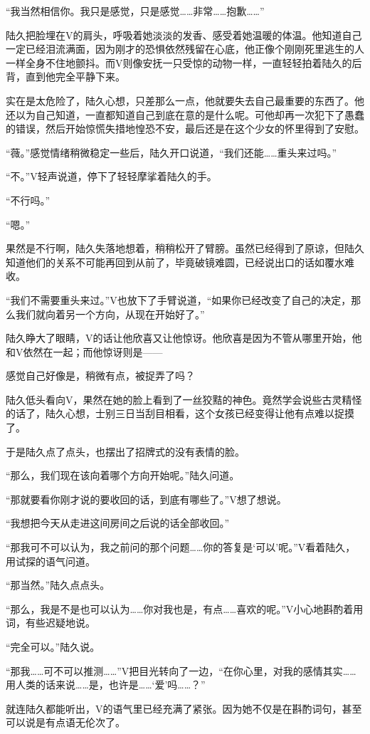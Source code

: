 “我当然相信你。我只是感觉，只是感觉……非常……抱歉……”

陆久把脸埋在V的肩头，呼吸着她淡淡的发香、感受着她温暖的体温。他知道自己一定已经泪流满面，因为刚才的恐惧依然残留在心底，他正像个刚刚死里逃生的人一样全身不住地颤抖。而V则像安抚一只受惊的动物一样，一直轻轻拍着陆久的后背，直到他完全平静下来。

实在是太危险了，陆久心想，只差那么一点，他就要失去自己最重要的东西了。他还以为自己知道，一直都知道自己到底在意的是什么呢。可他却再一次犯下了愚蠢的错误，然后开始惊慌失措地惶恐不安，最后还是在这个少女的怀里得到了安慰。

“薇。”感觉情绪稍微稳定一些后，陆久开口说道，“我们还能……重头来过吗。”

“不。”V轻声说道，停下了轻轻摩挲着陆久的手。

“不行吗。”

“嗯。”

果然是不行啊，陆久失落地想着，稍稍松开了臂膀。虽然已经得到了原谅，但陆久知道他们的关系不可能再回到从前了，毕竟破镜难圆，已经说出口的话如覆水难收。

“我们不需要重头来过。”V也放下了手臂说道，“如果你已经改变了自己的决定，那么我们就向着另一个方向，从现在开始好了。”

陆久睁大了眼睛，V的话让他欣喜又让他惊讶。他欣喜是因为不管从哪里开始，他和V依然在一起；而他惊讶则是——

感觉自己好像是，稍微有点，被捉弄了吗？

陆久低头看向V，果然在她的脸上看到了一丝狡黠的神色。竟然学会说些古灵精怪的话了，陆久心想，士别三日当刮目相看，这个女孩已经变得让他有点难以捉摸了。

于是陆久点了点头，也摆出了招牌式的没有表情的脸。

“那么，我们现在该向着哪个方向开始呢。”陆久问道。

“那就要看你刚才说的要收回的话，到底有哪些了。”V想了想说。

“我想把今天从走进这间房间之后说的话全部收回。”

“那我可不可以认为，我之前问的那个问题……你的答复是‘可以’呢。”V看着陆久，用试探的语气问道。

“那当然。”陆久点点头。

“那么，我是不是也可以认为……你对我也是，有点……喜欢的呢。”V小心地斟酌着用词，有些迟疑地说。

“完全可以。”陆久说。

“那我……可不可以推测……”V把目光转向了一边，“在你心里，对我的感情其实……用人类的话来说……是，也许是……‘爱’吗……？”

就连陆久都能听出，V的语气里已经充满了紧张。因为她不仅是在斟酌词句，甚至可以说是有点语无伦次了。

